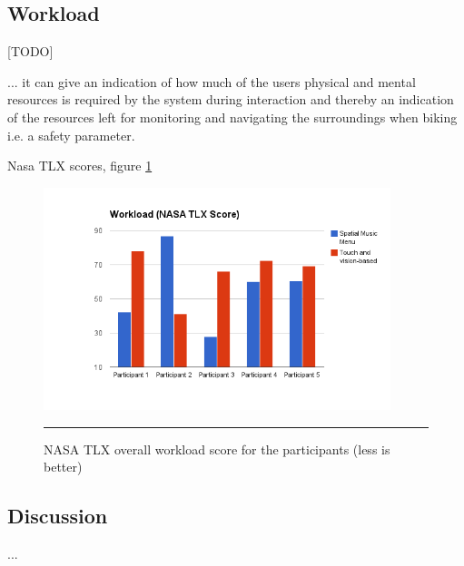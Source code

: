 \subsection{Workload}
[TODO]

... it can give an indication of how much of the users physical and mental resources is required by the system during interaction and thereby an indication of the resources left for monitoring and navigating the surroundings when biking i.e. a safety parameter.

Nasa TLX scores, figure \ref{fig:resultsnasatlx}

\begin{figure}[htbp]
	\centering
		\includegraphics[width=0.9\textwidth,height=\textheight,keepaspectratio]{./Figures/results_nasatlx.png}
		\rule{35em}{1pt}
	\caption[Results NASA TLX Score]{NASA TLX overall workload score for the participants (less is better)}
	\label{fig:resultsnasatlx}
\end{figure}

\subsection{Discussion}
...








